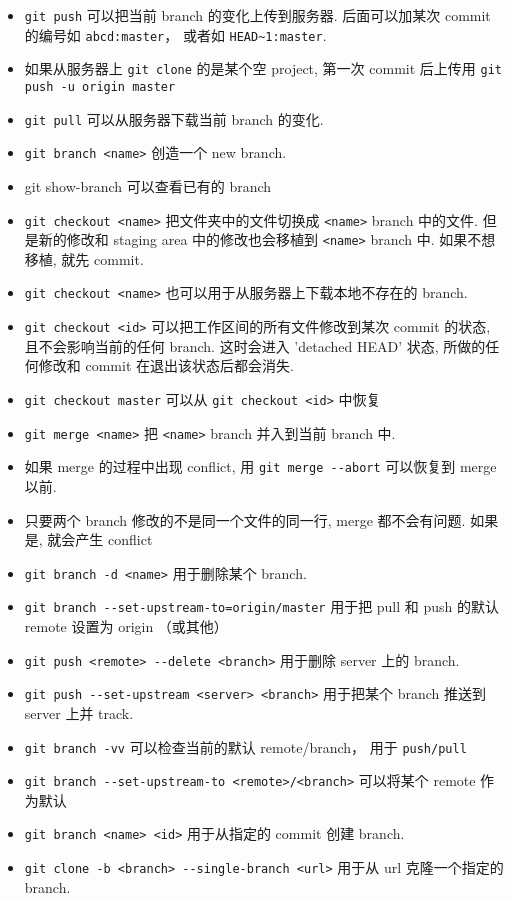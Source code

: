 \begin{itemize}
\item \verb|git push| 可以把当前 branch 的变化上传到服务器. 后面可以加某次 commit 的编号如 \verb|abcd:master|， 或者如 \verb|HEAD~1:master|.
\item 如果从服务器上 \verb|git clone| 的是某个空 project, 第一次 commit 后上传用 \verb|git push -u origin master|
\item \verb|git pull| 可以从服务器下载当前 branch 的变化.
\item \verb|git branch <name>| 创造一个 new branch.
\item git show-branch 可以查看已有的 branch
\item \verb|git checkout <name>| 把文件夹中的文件切换成 \verb|<name>| branch 中的文件. 但是新的修改和 staging area 中的修改也会移植到 \verb|<name>| branch 中. 如果不想移植, 就先 commit.
\item \verb|git checkout <name>| 也可以用于从服务器上下载本地不存在的 branch.
\item \verb|git checkout <id>| 可以把工作区间的所有文件修改到某次 commit 的状态, 且不会影响当前的任何 branch. 这时会进入 'detached HEAD' 状态, 所做的任何修改和 commit 在退出该状态后都会消失.
\item \verb|git checkout master| 可以从 \verb|git checkout <id>| 中恢复
\item \verb|git merge <name>| 把 \verb|<name>| branch 并入到当前 branch 中.
\item 如果 merge 的过程中出现 conflict, 用 \verb|git merge --abort| 可以恢复到 merge 以前.
\item 只要两个 branch 修改的不是同一个文件的同一行, merge 都不会有问题. 如果是, 就会产生 conflict
\item \verb|git branch -d <name>| 用于删除某个 branch.
\item \verb|git branch --set-upstream-to=origin/master| 用于把 pull 和 push 的默认 remote 设置为 origin （或其他）
\item \verb|git push <remote> --delete <branch>| 用于删除 server 上的 branch.
\item \verb|git push --set-upstream <server> <branch>| 用于把某个 branch 推送到 server 上并 track.
\item \verb|git branch -vv| 可以检查当前的默认 remote/branch， 用于 \verb|push/pull|
\item \verb|git branch --set-upstream-to <remote>/<branch>| 可以将某个 remote 作为默认
\item \verb|git branch <name> <id>| 用于从指定的 commit 创建 branch.
\item \verb|git clone -b <branch> --single-branch <url>| 用于从 url 克隆一个指定的 branch.

\end{itemize}
